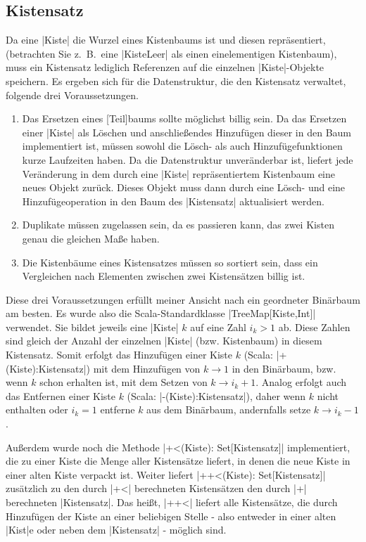 \subsection{Kistensatz}
 Da eine |Kiste| die Wurzel eines Kistenbaums ist und diesen repräsentiert, (betrachten Sie z.\ B.\ eine |KisteLeer| als einen einelementigen Kistenbaum),
  muss ein Kistensatz lediglich Referenzen auf die einzelnen |Kiste|-Objekte speichern.
 Es ergeben sich für die Datenstruktur, die den Kistensatz verwaltet, folgende drei Voraussetzungen. 
\begin{enumerate}
 \item Das Ersetzen eines [Teil]baums sollte möglichst billig sein.
  Da das Ersetzen einer |Kiste| als Löschen und anschließendes Hinzufügen dieser in den Baum implementiert ist,
   müssen sowohl die Lösch- als auch Hinzufügefunktionen kurze Laufzeiten haben.
  Da die Datenstruktur unveränderbar ist, liefert jede Veränderung in dem durch eine |Kiste| repräsentiertem Kistenbaum eine neues Objekt zurück.
  Dieses Objekt muss dann durch eine Lösch- und eine Hinzufügeoperation in den Baum des |Kistensatz| aktualisiert werden.
 \item Duplikate müssen zugelassen sein, da es passieren kann, das zwei Kisten genau die gleichen Maße haben.
 \item Die Kistenbäume eines Kistensatzes müssen so sortiert sein, dass ein Vergleichen nach Elementen zwischen zwei Kistensätzen billig ist.
\end{enumerate}
Diese drei Voraussetzungen erfüllt meiner Ansicht nach ein geordneter Binärbaum am besten.
Es wurde also die Scala-Standardklasse |TreeMap[Kiste,Int]| verwendet. Sie bildet jeweils eine |Kiste| $k$ auf eine Zahl $i_k > 1$ ab.
Diese Zahlen sind gleich der Anzahl der einzelnen |Kiste| (bzw. Kistenbaum) in diesem Kistensatz.
Somit erfolgt das Hinzufügen einer Kiste $k$ (Scala: |+(Kiste):Kistensatz|) mit dem Hinzufügen von $k \rightarrow 1$ in den Binärbaum,
  bzw. wenn $k$ schon erhalten ist, mit dem Setzen von $k \rightarrow i_k + 1$.
Analog erfolgt auch das Entfernen einer Kiste $k$ (Scala: |-(Kiste):Kistensatz|),
  daher wenn $k$ nicht enthalten oder $i_k = 1$ entferne $k$ aus dem Binärbaum, andernfalls setze $k \rightarrow i_k - 1$.

Außerdem wurde noch die Methode |+<(Kiste): Set[Kistensatz]| implementiert, die zu einer Kiste die Menge aller Kistensätze liefert,
in denen die neue Kiste in einer alten Kiste verpackt ist.
Weiter liefert |++<(Kiste): Set[Kistensatz]| zusätzlich zu den durch |+<| berechneten Kistensätzen den durch |+| berechneten |Kistensatz|.
Das heißt, |++<| liefert alle Kistensätze, die durch Hinzufügen der Kiste an einer beliebigen Stelle
 - also entweder in einer alten |Kist|e oder neben dem |Kistensatz| - möglich sind.
